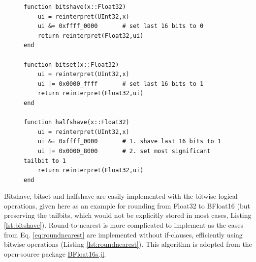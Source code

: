 \begin{figure}[tbhp]
\begin{lstlisting}[language=JuliaLocal, label=lst:bitshave, caption={\textbf{Bitwise implementation of bitshave, bitset and halfshave for
rounding to 7 mantissa bits.} Bitshave rounds a Float32 $x$ to $n_m = 7$ mantissa bits (equivalent to a BFloat16, but the tailing
bits remain stored) using the bitwise logical-and operation \&. For other number of mantissa bits to be retained the mask
\texttt{0xffff\_0000} has to be changed, e.g. \texttt{0xffff\_e000} will round to $n_m = 10$ mantissa bits. The function \texttt{reinterpret}
leaves the bits unchanged but changes the associated type. Bitset is implemented similar to bitshave but with the logical-or operation
$\vert$ which sets the tailing bits to \texttt{1}. Halfshave is similar to bitshave but the tailing bits are replaced by \texttt{100$...$0}.}]
function bitshave(x::Float32)
	ui = reinterpret(UInt32,x)
	ui &= 0xffff_0000	    # set last 16 bits to 0
	return reinterpret(Float32,ui)
end

function bitset(x::Float32)
	ui = reinterpret(UInt32,x)
	ui |= 0x0000_ffff    	# set last 16 bits to 1
	return reinterpret(Float32,ui)
end

function halfshave(x::Float32)
	ui = reinterpret(UInt32,x)
	ui &= 0xffff_0000    	# 1. shave last 16 bits to 1
	ui |= 0x0000_8000       # 2. set most significant tailbit to 1
	return reinterpret(Float32,ui)
end
\end{lstlisting}
\end{figure}
Bitshave, bitset and halfshave are easily implemented with the bitwise logical operations, given here as an example for rounding from
Float32 to BFloat16 (but preserving the tailbits, which would not be explicitly stored in most cases, Listing \ref{lst:bitshave}). Round-to-nearest
is more complicated to implement as the cases from Eq. \ref{eq:roundnearest} are implemented without if-clauses, efficiently using bitwise
operations (Listing \ref{lst:roundnearest}). This algorithm is adopted from the open-source package
\href{https://github.com/JuliaComputing/BFloat16s.jl}{BFloat16s.jl}.

